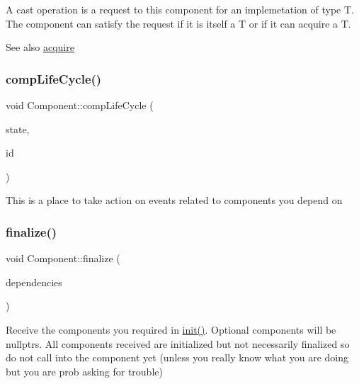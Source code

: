 A cast operation is a request to this component for an implemetation of type T. The component can satisfy the request if it is itself a T or if it can acquire a T. \begin{DoxySeeAlso}{See also}
\hyperlink{classtheoria_1_1core_1_1Component_a18744abc83e088af3c3d42e0a22c35e3}{acquire} 
\end{DoxySeeAlso}
\mbox{\label{classtheoria_1_1core_1_1Component_a92578e2b6253681a21b91e7c22b22975}} 
\subsubsection{\texorpdfstring{comp\+Life\+Cycle()}{compLifeCycle()}}
{\footnotesize\ttfamily void Component\+::comp\+Life\+Cycle (\begin{DoxyParamCaption}\item[{Comp\+Life\+Cycle}]{state,  }\item[{Comp\+Id}]{id }\end{DoxyParamCaption})\hspace{0.3cm}{\ttfamily [virtual]}}

This is a place to take action on events related to components you depend on \mbox{\label{classtheoria_1_1core_1_1Component_afd8acc89e2cd36e92bebe7e6fa530764}} 
\subsubsection{\texorpdfstring{finalize()}{finalize()}}
{\footnotesize\ttfamily void Component\+::finalize (\begin{DoxyParamCaption}\item[{const std\+::vector$<$ \hyperlink{classtheoria_1_1core_1_1Component}{Component} $\ast$$>$ \&}]{dependencies }\end{DoxyParamCaption})\hspace{0.3cm}{\ttfamily [virtual]}}

Receive the components you required in \hyperlink{classtheoria_1_1core_1_1Component_a7ed45f6e38442a40666ae4556f794f7d}{init()}. Optional components will be nullptrs. All components received are initialized but not necessarily finalized so do not call into the component yet (unless you really know what you are doing but you are prob asking for trouble) 

